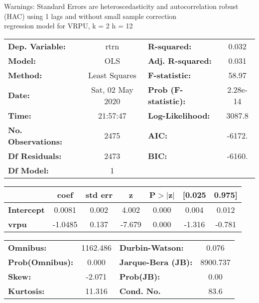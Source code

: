 Warnings: \newline
 [1] Standard Errors are heteroscedasticity and autocorrelation robust (HAC) using 1 lags and without small sample correction\\ 

regression model for VRPU, k = 2 h = 12\begin{center}
\begin{tabular}{lclc}
\toprule
\textbf{Dep. Variable:}    &       rtrn       & \textbf{  R-squared:         } &     0.032   \\
\textbf{Model:}            &       OLS        & \textbf{  Adj. R-squared:    } &     0.031   \\
\textbf{Method:}           &  Least Squares   & \textbf{  F-statistic:       } &     58.97   \\
\textbf{Date:}             & Sat, 02 May 2020 & \textbf{  Prob (F-statistic):} &  2.28e-14   \\
\textbf{Time:}             &     21:57:47     & \textbf{  Log-Likelihood:    } &    3087.8   \\
\textbf{No. Observations:} &        2475      & \textbf{  AIC:               } &    -6172.   \\
\textbf{Df Residuals:}     &        2473      & \textbf{  BIC:               } &    -6160.   \\
\textbf{Df Model:}         &           1      & \textbf{                     } &             \\
\bottomrule
\end{tabular}
\begin{tabular}{lcccccc}
                   & \textbf{coef} & \textbf{std err} & \textbf{z} & \textbf{P$> |$z$|$} & \textbf{[0.025} & \textbf{0.975]}  \\
\midrule
\textbf{Intercept} &       0.0081  &        0.002     &     4.002  &         0.000        &        0.004    &        0.012     \\
\textbf{vrpu}      &      -1.0485  &        0.137     &    -7.679  &         0.000        &       -1.316    &       -0.781     \\
\bottomrule
\end{tabular}
\begin{tabular}{lclc}
\textbf{Omnibus:}       & 1162.486 & \textbf{  Durbin-Watson:     } &    0.076  \\
\textbf{Prob(Omnibus):} &   0.000  & \textbf{  Jarque-Bera (JB):  } & 8900.737  \\
\textbf{Skew:}          &  -2.071  & \textbf{  Prob(JB):          } &     0.00  \\
\textbf{Kurtosis:}      &  11.316  & \textbf{  Cond. No.          } &     83.6  \\
\bottomrule
\end{tabular}
\end{center}

